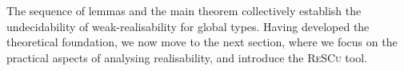 The sequence of lemmas and the main theorem collectively establish the
undecidability of weak-realisability for global types. Having developed the
theoretical foundation, we now move to the next section, where we focus on the
practical aspects of analysing realisability, and introduce the \textsc{ReSCu} tool.